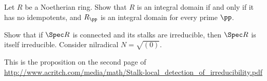 \begin{problem}
	\gim
	Let $R$ be a Noetherian ring.
	Show that $R$ is an integral domain if and only if it has no idempotents,
	and $R_\pp$ is an integral domain for every prime $\pp$.
	\begin{hint}
		Show that if $\Spec R$ is connected and its stalks are irreducible,
		then $\Spec R$ is itself irreducible.
		Consider nilradical $N = \sqrt{(0)}$.
	\end{hint}
	\begin{sol}
		This is the proposition on the second page of
		\url{http://www.acritch.com/media/math/Stalk-local_detection_of_irreducibility.pdf}
	\end{sol}
\end{problem}
